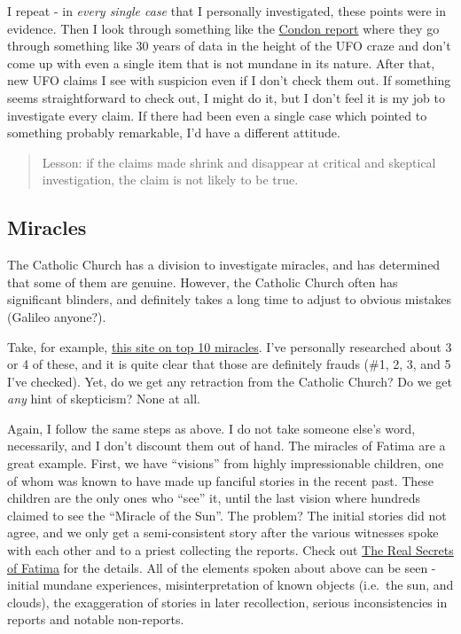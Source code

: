 I repeat - in \emph{every single case} that I personally investigated,
these points were in evidence. Then I look through something like the
\href{http://files.ncas.org/condon/text/contents.htm}{Condon report}
where they go through something like 30 years of data in the height of
the UFO craze and don't come up with even a single item that is not
mundane in its nature. After that, new UFO claims I see with suspicion
even if I don't check them out. If something seems straightforward to
check out, I might do it, but I don't feel it is my job to investigate
every claim. If there had been even a single case which pointed to
something probably remarkable, I'd have a different attitude.

\begin{quote}
Lesson: if the claims made shrink and disappear at critical and
skeptical investigation, the claim is not likely to be true.
\end{quote}

\subsection{Miracles}\label{pandoc-miracles}

The Catholic Church has a division to investigate miracles, and has
determined that some of them are genuine. However, the Catholic Church
often has significant blinders, and definitely takes a long time to
adjust to obvious mistakes (Galileo anyone?).

Take, for example,
\href{http://listverse.com/2008/07/14/top-10-astonishing-miracles/}{this
site on top 10 miracles}. I've personally researched about 3 or 4 of
these, and it is quite clear that those are definitely frauds (\#1, 2,
3, and 5 I've checked). Yet, do we get any retraction from the Catholic
Church? Do we get \emph{any} hint of skepticism? None at all.

Again, I follow the same steps as above. I do not take someone else's
word, necessarily, and I don't discount them out of hand. The miracles
of Fatima are a great example. First, we have ``visions'' from highly
impressionable children, one of whom was known to have made up fanciful
stories in the recent past. These children are the only ones who ``see''
it, until the last vision where hundreds claimed to see the ``Miracle of
the Sun''. The problem? The initial stories did not agree, and we only
get a semi-consistent story after the various witnesses spoke with each
other and to a priest collecting the reports. Check out
\href{http://www.csicop.org/si/show/real_secrets_of_fatima/}{The Real
Secrets of Fatima} for the details. All of the elements spoken about
above can be seen - initial mundane experiences, misinterpretation of
known objects (i.e.~the sun, and clouds), the exaggeration of stories in
later recollection, serious inconsistencies in reports and notable
non-reports.

